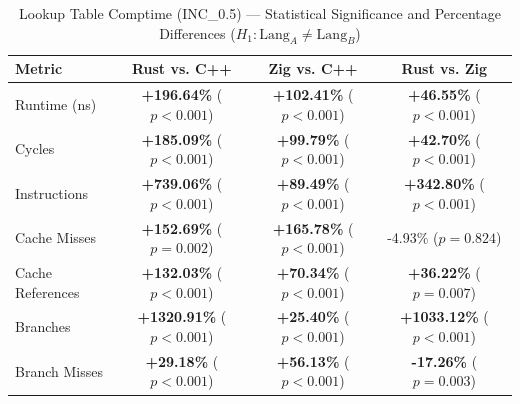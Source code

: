 \begin{table}[htbp]
\centering
\caption{Lookup Table Comptime (INC_0.5) --- Statistical Significance and Percentage Differences ($H_1: \text{Lang}_A \neq \text{Lang}_B$)}
\label{tab:lut_comptime_0_5}
\begin{tabular}{l ccc}
\toprule
\textbf{Metric} & \textbf{Rust vs. C++} & \textbf{Zig vs. C++} & \textbf{Rust vs. Zig} \\
\midrule
Runtime (ns) & \textbf{+196.64\%} ($p < 0.001$) & \textbf{+102.41\%} ($p < 0.001$) & \textbf{+46.55\%} ($p < 0.001$) \\
Cycles & \textbf{+185.09\%} ($p < 0.001$) & \textbf{+99.79\%} ($p < 0.001$) & \textbf{+42.70\%} ($p < 0.001$) \\
Instructions & \textbf{+739.06\%} ($p < 0.001$) & \textbf{+89.49\%} ($p < 0.001$) & \textbf{+342.80\%} ($p < 0.001$) \\
Cache Misses & \textbf{+152.69\%} ($p = 0.002$) & \textbf{+165.78\%} ($p < 0.001$) & -4.93\% ($p = 0.824$) \\
Cache References & \textbf{+132.03\%} ($p < 0.001$) & \textbf{+70.34\%} ($p < 0.001$) & \textbf{+36.22\%} ($p = 0.007$) \\
Branches & \textbf{+1320.91\%} ($p < 0.001$) & \textbf{+25.40\%} ($p < 0.001$) & \textbf{+1033.12\%} ($p < 0.001$) \\
Branch Misses & \textbf{+29.18\%} ($p < 0.001$) & \textbf{+56.13\%} ($p < 0.001$) & \textbf{-17.26\%} ($p = 0.003$) \\
\bottomrule
\end{tabular}
\end{table}


